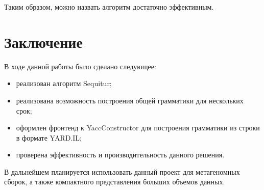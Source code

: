\documentclass[14pt]{matmex-diploma}
\begin{document}
    Таким образом, можно назвать алгоритм достаточно эффективным.



\section{Заключение}
    В ходе данной работы было сделано следующее:
    \begin{itemize}
        \item реализован алгоритм Sequitur;
        \item реализована возможность построения общей грамматики для нескольких срок; 
        \item оформлен фронтенд к YaccConstructor для построения грамматики из строки в формате YARD.IL;
        \item проверена эффективность и производительность данного решения.
    \end{itemize}

    В дальнейшем планируется использовать данный проект для метагеномных сборок, а также компактного представления больших объемов данных.

\setmonofont[Mapping=tex-text]{CMU Typewriter Text}


\end{document}
